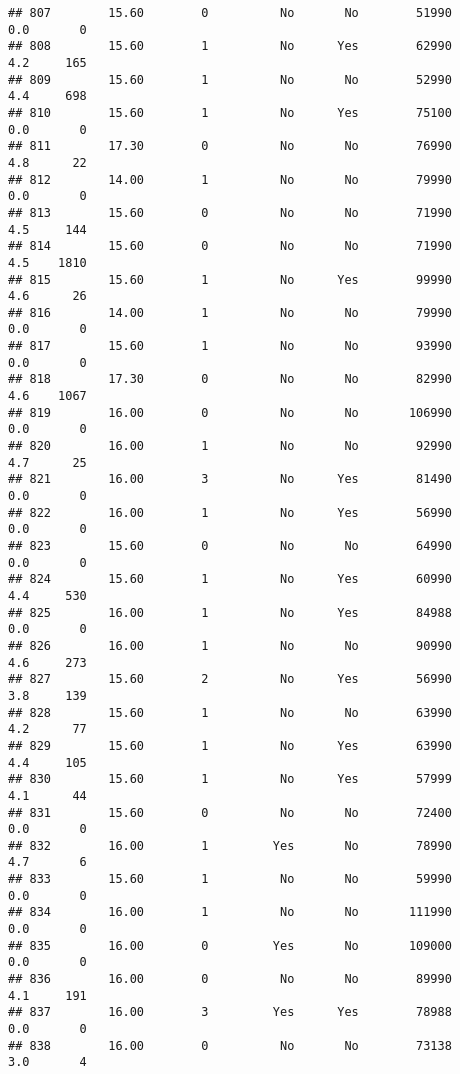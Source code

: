 \documentclass[
]{article}
\begin{document}
\begin{verbatim}
## 807        15.60        0          No       No        51990         0.0       0
## 808        15.60        1          No      Yes        62990         4.2     165
## 809        15.60        1          No       No        52990         4.4     698
## 810        15.60        1          No      Yes        75100         0.0       0
## 811        17.30        0          No       No        76990         4.8      22
## 812        14.00        1          No       No        79990         0.0       0
## 813        15.60        0          No       No        71990         4.5     144
## 814        15.60        0          No       No        71990         4.5    1810
## 815        15.60        1          No      Yes        99990         4.6      26
## 816        14.00        1          No       No        79990         0.0       0
## 817        15.60        1          No       No        93990         0.0       0
## 818        17.30        0          No       No        82990         4.6    1067
## 819        16.00        0          No       No       106990         0.0       0
## 820        16.00        1          No       No        92990         4.7      25
## 821        16.00        3          No      Yes        81490         0.0       0
## 822        16.00        1          No      Yes        56990         0.0       0
## 823        15.60        0          No       No        64990         0.0       0
## 824        15.60        1          No      Yes        60990         4.4     530
## 825        16.00        1          No      Yes        84988         0.0       0
## 826        16.00        1          No       No        90990         4.6     273
## 827        15.60        2          No      Yes        56990         3.8     139
## 828        15.60        1          No       No        63990         4.2      77
## 829        15.60        1          No      Yes        63990         4.4     105
## 830        15.60        1          No      Yes        57999         4.1      44
## 831        15.60        0          No       No        72400         0.0       0
## 832        16.00        1         Yes       No        78990         4.7       6
## 833        15.60        1          No       No        59990         0.0       0
## 834        16.00        1          No       No       111990         0.0       0
## 835        16.00        0         Yes       No       109000         0.0       0
## 836        16.00        0          No       No        89990         4.1     191
## 837        16.00        3         Yes      Yes        78988         0.0       0
## 838        16.00        0          No       No        73138         3.0       4

\end{verbatim}
\end{document}
